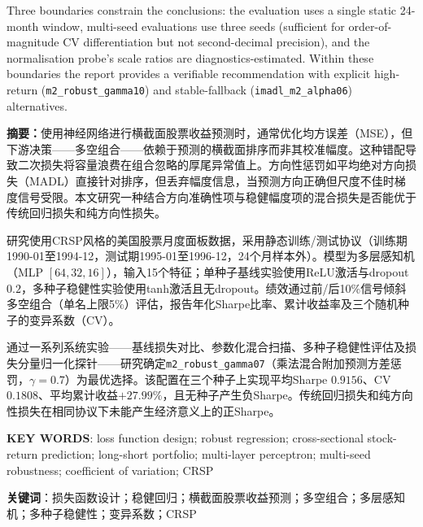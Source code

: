 Three boundaries constrain the conclusions: the evaluation uses a single static 24-month window, multi-seed evaluations use three seeds (sufficient for order-of-magnitude CV differentiation but not second-decimal precision), and the normalisation probe's scale ratios are diagnostics-estimated. Within these boundaries the report provides a verifiable recommendation with explicit high-return (\texttt{m2\_robust\_gamma10}) and stable-fallback (\texttt{imadl\_m2\_alpha06}) alternatives.

\vspace{1.5cm}

\newpage

\noindent\textbf{摘要：}使用神经网络进行横截面股票收益预测时，通常优化均方误差（MSE），但下游决策——多空组合——依赖于预测的横截面排序而非其校准幅度。这种错配导致二次损失将容量浪费在组合忽略的厚尾异常值上。方向性惩罚如平均绝对方向损失（MADL）直接针对排序，但丢弃幅度信息，当预测方向正确但尺度不佳时梯度信号受限。本文研究一种结合方向准确性项与稳健幅度项的混合损失是否能优于传统回归损失和纯方向性损失。

研究使用CRSP风格的美国股票月度面板数据，采用静态训练/测试协议（训练期1990-01至1994-12，测试期1995-01至1996-12，24个月样本外）。模型为多层感知机（MLP $[64, 32, 16]$），输入15个特征；单种子基线实验使用ReLU激活与dropout $0.2$，多种子稳健性实验使用tanh激活且无dropout。绩效通过前/后10\%信号倾斜多空组合（单名上限5\%）评估，报告年化Sharpe比率、累计收益率及三个随机种子的变异系数（CV）。

通过一系列系统实验——基线损失对比、参数化混合扫描、多种子稳健性评估及损失分量归一化探针——研究确定\texttt{m2\_robust\_gamma07}（乘法混合附加预测方差惩罚，$\gamma = 0.7$）为最优选择。该配置在三个种子上实现平均Sharpe $0.9156$、CV $0.1808$、平均累计收益$+27.99\%$，且无种子产生负Sharpe。传统回归损失和纯方向性损失在相同协议下未能产生经济意义上的正Sharpe。

\vspace{2cm}

\noindent \textbf{KEY WORDS}: loss function design; robust regression; cross-sectional stock-return prediction; long-short portfolio; multi-layer perceptron; multi-seed robustness; coefficient of variation; CRSP

\noindent \textbf{关键词}：损失函数设计；稳健回归；横截面股票收益预测；多空组合；多层感知机；多种子稳健性；变异系数；CRSP

